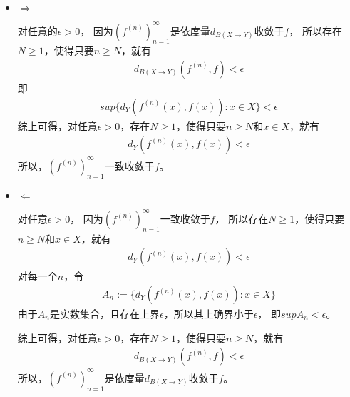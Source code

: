 \documentclass{article}
\begin{document}
\begin{itemize}
  \item $\Rightarrow$

        对任意的$\epsilon > 0$，
        因为$(f^{(n)})_{n = 1}^\infty$是依度量$d_{B(X \to Y)}$收敛于$f$，
        所以存在$N \geq 1$，使得只要$n \geq N$，就有
        \begin{align*}
          d_{B(X \to Y)}(f^{(n)}, f) < \epsilon
        \end{align*}
        即
        \begin{align*}
          sup\{d_Y(f^{(n)}(x), f(x)) : x \in X\} < \epsilon
        \end{align*}
        综上可得，对任意$\epsilon > 0$，存在$N \geq 1$，使得只要$n \geq N$和$x \in X$，就有
        \begin{align*}
          d_Y(f^{(n)}(x), f(x)) < \epsilon
        \end{align*}
        所以，$(f^{(n)})_{n = 1}^\infty$一致收敛于$f$。

  \item $\Leftarrow$

        对任意$\epsilon > 0$，
        因为$(f^{(n)})_{n = 1}^\infty$一致收敛于$f$，
        所以存在$N \geq 1$，使得只要$n \geq N$和$x \in X$，就有
        \begin{align*}
          d_Y(f^{(n)}(x), f(x)) < \epsilon
        \end{align*}
        对每一个$n$，令
        \begin{align*}
          A_n := \{d_Y(f^{(n)}(x), f(x)): x \in X\}
        \end{align*}
        由于$A_n$是实数集合，且存在上界$\epsilon$，所以其上确界小于$\epsilon$，
        即$sup A_n < \epsilon$。

        综上可得，对任意$\epsilon > 0$，存在$N \geq 1$，使得只要$n \geq N$，就有
        \begin{align*}
          d_{B(X \to Y)}(f^{(n)}, f) < \epsilon
        \end{align*}
        所以，$(f^{(n)})_{n = 1}^\infty$是依度量$d_{B(X \to Y)}$收敛于$f$。

\end{itemize}
\end{document}
